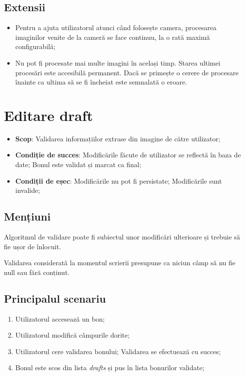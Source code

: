 \subsection{Extensii}\label{extensii}

\begin{itemize}
\item
  Pentru a ajuta utilizatorul atunci când folosește camera, procesarea
  imaginilor venite de la cameră se face continuu, la o rată maximă
  configurabilă;
\item
  Nu pot fi procesate mai multe imagini în același timp. Starea ultimei
  procesări este accesibilă permanent. Dacă se primește o cerere de
  procesare înainte ca ultima să se fi încheiat este semnalată o eroare.
\end{itemize}


\section{Editare draft}\label{editare-draft}

\begin{itemize}
\item
  \textbf{Scop}: Validarea informațiilor extrase din imagine de către utilizator;
\item
  \textbf{Condiție de succes}: Modificările făcute de utilizator se reflectă în baza de date; Bonul este validat și marcat ca final;
\item
  \textbf{Condiții de eșec}: Modificările nu pot fi persistate; Modificările sunt invalide;
\end{itemize}

\subsection{Mențiuni}\label{menux21biuni-1}

Algoritmul de validare poate fi subiectul unor modificări ulterioare și trebuie să fie ușor de înlocuit.

Validarea considerată la momentul scrierii presupune ca niciun câmp să nu fie null sau fără conținut.

\subsection{Principalul scenariu}\label{principalul-scenariu-1}

\begin{enumerate}
\item
  Utilizatorul accesează un bon;
\item
  Utilizatorul modifică câmpurile dorite;
\item
  Utilizatorul cere validarea bonului; Validarea se efectuează cu succes;
\item
  Bonul este scos din lista \emph{drafts} și pus în lista bonurilor validate;
\end{enumerate}

